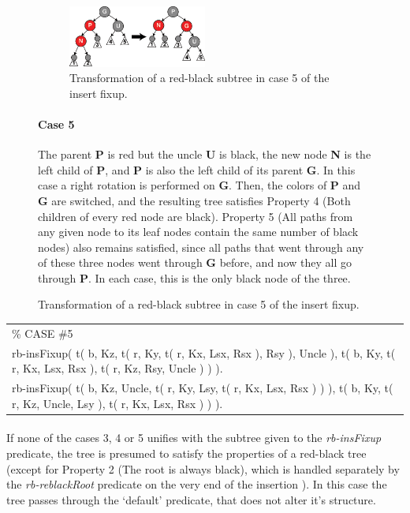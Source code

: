 \documentclass{article}
\newenvironment{code}{\obeycr\begin{it}\nopagebreak\addvspace{1ex}\noindent\footnotesize\begin{tabular}{|p{0.95\textwidth}|}\hline}{\\\hline\end{tabular}\par\addvspace{1ex}\end{it}\restorecr}
\newcommand{\inlinecode}[1]{\textit{#1}}
\begin{document}
\begin{figure}[h]
  \begin{figure}
    \includegraphics[width=0.5\textwidth]{Red-black_tree_insert_case_5}
    \caption{Transformation of a red-black subtree in case 5 of the insert fixup.}
    \label{insFix5}
  \end{figure}
  \paragraph{Case 5}
The parent \textbf{P} is red but the uncle \textbf{U} is black, the new node \textbf{N} is the left child of \textbf{P}, and \textbf{P} is also the left child of its parent \textbf{G}. In this case a right rotation is performed on \textbf{G}. Then, the colors of \textbf{P} and \textbf{G} are switched, and the resulting tree satisfies Property 4 (Both children of every red node are black). Property 5 (All paths from any given node to its leaf nodes contain the same number of black nodes) also remains satisfied, since all paths that went through any of these three nodes went through \textbf{G} before, and now they all go through \textbf{P}. In each case, this is the only black node of the three.
\end{figure}

\begin{code}
\% CASE \#5\\
rb-insFixup( t( b, Kz, t( r, Ky, t( r, Kx, Lsx, Rsx ), Rsy ), Uncle ), t( b, Ky, t( r, Kx, Lsx, Rsx ), t( r, Kz, Rsy, Uncle ) ) ).\\
rb-insFixup( t( b, Kz, Uncle, t( r, Ky, Lsy, t( r, Kx, Lsx, Rsx ) ) ), t( b, Ky, t( r, Kz, Uncle, Lsy ), t( r, Kx, Lsx, Rsx ) ) ).
\end{code}

\paragraph{}
If none of the cases 3, 4 or 5 unifies with the subtree given to the \inlinecode{rb-insFixup} predicate, the tree is presumed to satisfy the properties of a red-black tree (except for Property 2 (The root is always black), which is handled separately by the \inlinecode{rb-reblackRoot} predicate on the very end of the insertion ). In this case the tree passes through the `default' predicate, that does not alter it's structure.
\end{document}
